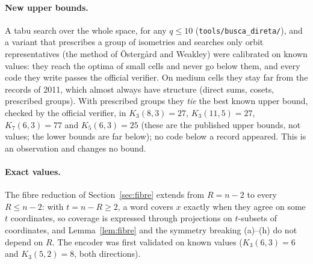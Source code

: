 \documentclass[11pt]{amsart}
\theoremstyle{definition}
\theoremstyle{remark}
\begin{document}
\paragraph{New upper bounds.}
A tabu search over the whole space, for any $q\le 10$ (\texttt{tools/\allowbreak busca\_\allowbreak direta/}), and a variant that prescribes a group of isometries and searches only orbit representatives (the method of Östergård and Weakley) were calibrated on known values: they reach the optima of small cells and never go below them, and every code they write passes the official verifier.
On medium cells they stay far from the records of 2011, which almost always have structure (direct sums, cosets, prescribed groups).
With prescribed groups they \emph{tie} the best known upper bound, checked by the official verifier, in $K_3(8,3)=27$, $K_3(11,5)=27$, $K_7(6,3)=77$ and $K_5(6,3)=25$ (these are the published upper bounds, not values; the lower bounds are far below); no code below a record appeared.
This is an observation and changes no bound.

\paragraph{Exact values.}
The fibre reduction of Section~\ref{sec:fibre} extends from $R=n-2$ to every $R\le n-2$: with $t=n-R\ge 2$, a word covers $x$ exactly when they agree on some $t$ coordinates, so coverage is expressed through projections on $t$-subsets of coordinates, and Lemma~\ref{lem:fibre} and the symmetry breaking (a)--(h) do not depend on $R$.
The encoder was first validated on known values ($K_3(6,3)=6$ and $K_3(5,2)=8$, both directions).
\end{document}
